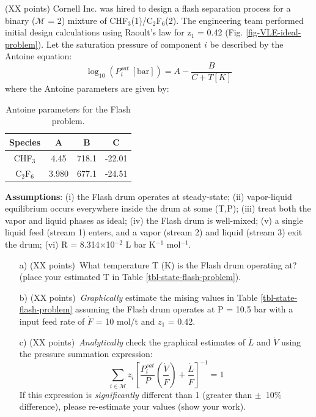     \item{(XX points) Cornell Inc. was hired to design a flash separation process for a binary ($\mathcal{M}$ = 2) mixture of CHF$_{\mathrm{3}}$(1)/C$_{\mathrm{2}}$F$_{\mathrm{6}}$(2).
    The engineering team performed initial design calculations using Raoult's law for z$_{1}$ = 0.42
    (Fig. \ref{fig-VLE-ideal-problem}). Let the saturation pressure of component $i$ be described by the
    Antoine equation:
    \begin{equation}
      \log_{10}\left(P_{i}^{sat}~[\mathrm{bar}]\right) = A - \frac{B}{C+T[K]}
    \end{equation}where the Antoine parameters are given by:
    
    \begin{table}[!ht]
      \centering
      \caption{Antoine parameters for the Flash problem.}
      \setlength{\tabcolsep}{18pt}
      \begin{tabular}{c|c|c|c}\toprule
        Species & A & B & C \\ \toprule
        CHF$_{\mathrm{3}}$ & 4.45 & 718.1 & -22.01 \\
        C$_{\mathrm{2}}$F$_{\mathrm{6}}$ & 3.980 & 677.1 & -24.51 \\\bottomrule
      \end{tabular}
    \end{table}
    
    \textbf{Assumptions}: (i) the Flash drum operates at steady-state;
    (ii) vapor-liquid equilibrium occurs everywhere inside the drum at some (T,P);
    (iii) treat both the vapor and liquid phases as ideal;
    (iv) the Flash drum is well-mixed;
    (v) a single liquid feed (stream 1) enters, and a vapor (stream 2) and liquid (stream 3) exit the drum;
    (vi) R = 8.314$\times$10$^{-2}$ L bar K$^{-1}$ mol$^{-1}$.
    
    \begin{itemize}
      \item[a)]{(XX points)~What temperature T (K) is the Flash drum operating at? (place your estimated T in Table
      \ref{tbl-state-flash-problem}).}
      \item[b)]{(XX points)~\textit{Graphically} estimate the mising values in Table \ref{tbl-state-flash-problem} assuming the Flash drum operates at P = 10.5 bar with a input feed rate of $\dot{F}$ = 10 mol/t and $z_{1}$ = 0.42.}
      \item[c)]{(XX points)~\textit{Analytically} check the graphical estimates of $\dot{L}$ and $\dot{V}$ using the pressure summation expression:
      \begin{equation}
        \sum_{i\in\mathcal{M}}z_{i}\left[\frac{P_{i}^{sat}}{P}\left(\frac{\dot{V}}{\dot{F}}\right)+\frac{\dot{L}}{\dot{F}}\right]^{-1} = 1
      \end{equation} If this expression is \textit{significantly} different than 1 (greater than $\pm$~10\% difference),
      please re-estimate your values (show your work).}
    \end{itemize}
    
}
